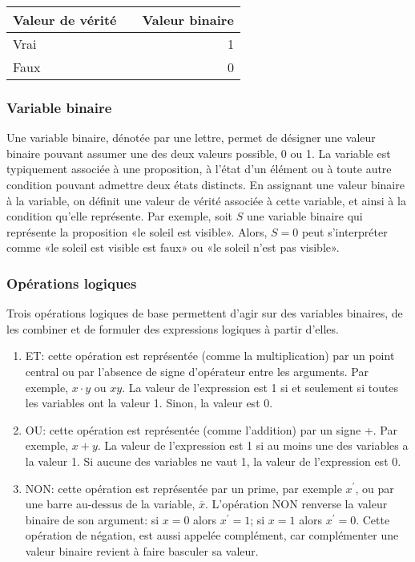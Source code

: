 \documentclass[11pt]{article}
\begin{document}
\begin{center}
\begin{tabular}{llr}
Valeur de vérité &  & Valeur binaire\\[0pt]
\hline
Vrai &  & 1\\[0pt]
Faux &  & 0\\[0pt]
\end{tabular}
\end{center}


\subsubsection{Variable binaire}
\label{sec:org0ae436b}

Une variable binaire, dénotée par une lettre, permet de désigner une
valeur binaire pouvant assumer une des deux valeurs possible, 0
ou 1. La variable est typiquement associée à une proposition, à l'état
d'un élément ou à toute autre condition pouvant admettre deux états
distincts. En assignant une valeur binaire à la variable, on définit
une valeur de vérité associée à cette variable, et ainsi à la
condition qu'elle représente. Par exemple, soit \(S\) une variable
binaire qui représente la proposition «le soleil est visible». Alors,
\(S=0\) peut s'interpréter comme «le soleil est visible est faux» ou
«le soleil n'est pas visible».

\subsubsection{Opérations logiques}
\label{sec:orgff9695d}

Trois opérations logiques de base permettent d'agir sur des variables
binaires, de les combiner et de formuler des expressions logiques à
partir d'elles.

\begin{enumerate}
\item ET: cette opération est représentée (comme la multiplication) par
un point central ou par l'absence de signe d'opérateur entre les
arguments. Par exemple, \(x \cdot y\) ou \(x y\). La valeur de
l'expression est 1 si et seulement si toutes les variables ont la
valeur 1. Sinon, la valeur est 0.
\item OU: cette opération est représentée (comme l'addition) par un signe
+. Par exemple, \(x + y\). La valeur de l'expression est 1 si au
moins une des variables a la valeur 1. Si aucune des variables ne
vaut 1, la valeur de l'expression est 0.
\item NON: cette opération est représentée par un prime, par
exemple \(x^\prime\), ou par une barre au-dessus de la variable,
\(\overline{x}\).  L'opération NON renverse la valeur binaire de
son argument: si \(x =0\) alors \(x^ \prime = 1\); si \(x =1\)
alors \(x^ \prime = 0\). Cette opération de négation, est aussi
appelée complément, car complémenter une valeur binaire revient à
faire basculer sa valeur.
\end{enumerate}
\end{document}
